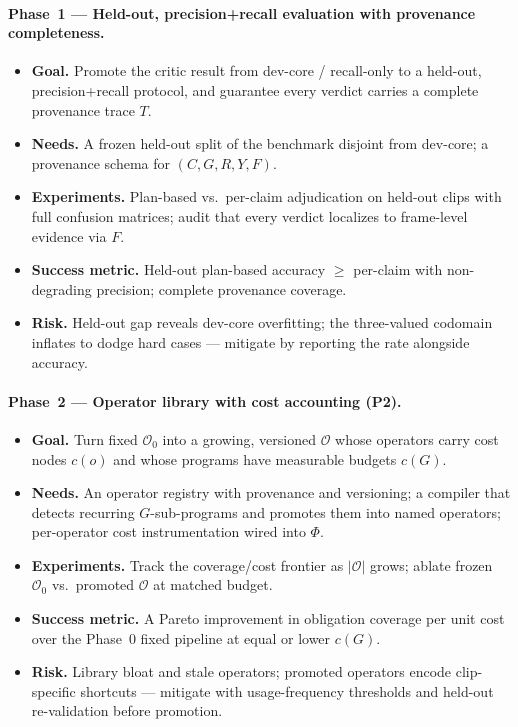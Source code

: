 \paragraph{Phase~1 --- Held-out, precision+recall evaluation with provenance completeness.}
\begin{itemize}
  \item \textbf{Goal.} Promote the critic result from dev-core / recall-only to a
    held-out, precision+recall protocol, and guarantee every verdict carries a
    complete provenance trace $T$.
  \item \textbf{Needs.} A frozen held-out split of the benchmark disjoint from
    dev-core; a provenance schema for $(C,G,R,Y,F)$.
  \item \textbf{Experiments.} Plan-based vs.\ per-claim adjudication on held-out
    clips with full confusion matrices; audit that every \contradicted{} verdict
    localizes to frame-level evidence via $F$.
  \item \textbf{Success metric.} Held-out plan-based accuracy $\geq$ per-claim
    with non-degrading precision; complete provenance coverage.
  \item \textbf{Risk.} Held-out gap reveals dev-core overfitting; the
    three-valued codomain inflates \unknownv{} to dodge hard cases --- mitigate
    by reporting the \unknownv{} rate alongside accuracy.
\end{itemize}

\paragraph{Phase~2 --- Operator library with cost accounting (P2).}
\begin{itemize}
  \item \textbf{Goal.} Turn fixed $\mathcal{O}_0$ into a growing, versioned $\mathcal{O}$ whose
    operators carry cost nodes $c(o)$ and whose programs have measurable budgets
    $c(G)$.
  \item \textbf{Needs.} An operator registry with provenance and versioning; a
    compiler that detects recurring $G$-sub-programs and promotes them into named
    operators; per-operator cost instrumentation wired into $\Phi$.
  \item \textbf{Experiments.} Track the coverage/cost frontier as $|\mathcal{O}|$ grows;
    ablate frozen $\mathcal{O}_0$ vs.\ promoted $\mathcal{O}$ at matched budget.
  \item \textbf{Success metric.} A Pareto improvement in obligation coverage
    per unit cost over the Phase~0 fixed pipeline at equal or lower $c(G)$.
  \item \textbf{Risk.} Library bloat and stale operators; promoted operators
    encode clip-specific shortcuts --- mitigate with usage-frequency thresholds
    and held-out re-validation before promotion.
\end{itemize}

